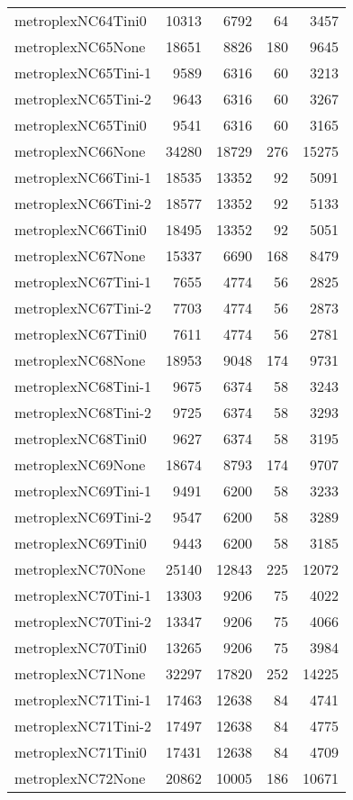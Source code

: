 \begin{longtable}{lrrrr}
metroplexNC64Tini0 & 10313 & 6792 & 64 & 3457 \\
metroplexNC65None & 18651 & 8826 & 180 & 9645 \\
metroplexNC65Tini-1 & 9589 & 6316 & 60 & 3213 \\
metroplexNC65Tini-2 & 9643 & 6316 & 60 & 3267 \\
metroplexNC65Tini0 & 9541 & 6316 & 60 & 3165 \\
metroplexNC66None & 34280 & 18729 & 276 & 15275 \\
metroplexNC66Tini-1 & 18535 & 13352 & 92 & 5091 \\
metroplexNC66Tini-2 & 18577 & 13352 & 92 & 5133 \\
metroplexNC66Tini0 & 18495 & 13352 & 92 & 5051 \\
metroplexNC67None & 15337 & 6690 & 168 & 8479 \\
metroplexNC67Tini-1 & 7655 & 4774 & 56 & 2825 \\
metroplexNC67Tini-2 & 7703 & 4774 & 56 & 2873 \\
metroplexNC67Tini0 & 7611 & 4774 & 56 & 2781 \\
metroplexNC68None & 18953 & 9048 & 174 & 9731 \\
metroplexNC68Tini-1 & 9675 & 6374 & 58 & 3243 \\
metroplexNC68Tini-2 & 9725 & 6374 & 58 & 3293 \\
metroplexNC68Tini0 & 9627 & 6374 & 58 & 3195 \\
metroplexNC69None & 18674 & 8793 & 174 & 9707 \\
metroplexNC69Tini-1 & 9491 & 6200 & 58 & 3233 \\
metroplexNC69Tini-2 & 9547 & 6200 & 58 & 3289 \\
metroplexNC69Tini0 & 9443 & 6200 & 58 & 3185 \\
metroplexNC70None & 25140 & 12843 & 225 & 12072 \\
metroplexNC70Tini-1 & 13303 & 9206 & 75 & 4022 \\
metroplexNC70Tini-2 & 13347 & 9206 & 75 & 4066 \\
metroplexNC70Tini0 & 13265 & 9206 & 75 & 3984 \\
metroplexNC71None & 32297 & 17820 & 252 & 14225 \\
metroplexNC71Tini-1 & 17463 & 12638 & 84 & 4741 \\
metroplexNC71Tini-2 & 17497 & 12638 & 84 & 4775 \\
metroplexNC71Tini0 & 17431 & 12638 & 84 & 4709 \\
metroplexNC72None & 20862 & 10005 & 186 & 10671 \\

\end{longtable}
